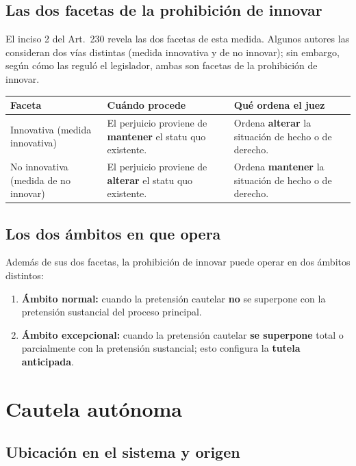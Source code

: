 \documentclass[12pt,oneside]{book}
\renewcommand{\arraystretch}{1.15}
\begin{document}
\subsection{Las dos facetas de la prohibición de innovar}

El inciso 2 del Art.~230 revela las dos facetas de esta medida. Algunos autores las consideran dos vías distintas (medida innovativa y de no innovar); sin embargo, según cómo las reguló el legislador, ambas son facetas de la prohibición de innovar.

\medskip
\renewcommand{\arraystretch}{1.3}
\noindent\begin{tabularx}{\textwidth}{@{}>{\raggedright\arraybackslash}p{2.6cm} Y Y@{}}
\toprule
\textbf{Faceta} & \textbf{Cuándo procede} & \textbf{Qué ordena el juez} \\
\midrule
Innovativa (medida innovativa) &
El perjuicio proviene de \textbf{mantener} el statu quo existente. &
Ordena \textbf{alterar} la situación de hecho o de derecho. \\
\addlinespace
No innovativa (medida de no innovar) &
El perjuicio proviene de \textbf{alterar} el statu quo existente. &
Ordena \textbf{mantener} la situación de hecho o de derecho. \\
\bottomrule
\end{tabularx}
\renewcommand{\arraystretch}{1}

\subsection{Los dos ámbitos en que opera}

Además de sus dos facetas, la prohibición de innovar puede operar en dos ámbitos distintos:

\begin{enumerate}
    \item \textbf{Ámbito normal:} cuando la pretensión cautelar \textbf{no} se superpone con la pretensión sustancial del proceso principal.
    \item \textbf{Ámbito excepcional:} cuando la pretensión cautelar \textbf{se superpone} total o parcialmente con la pretensión sustancial; esto configura la \textbf{tutela anticipada}.
\end{enumerate}

\section{Cautela autónoma}

\subsection{Ubicación en el sistema y origen}
\end{document}

